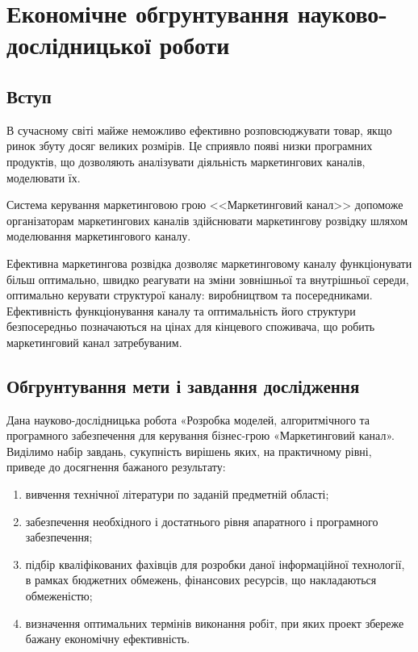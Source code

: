 ﻿\section{Економічне обгрунтування науково-дослідницької роботи}
    \subsection{Вступ}

В сучасному світі майже неможливо ефективно розповсюджувати товар, якщо ринок збуту досяг великих розмірів. Це сприявло появі низки програмних продуктів, що дозволяють аналізувати діяльність маркетингових каналів, моделювати їх.

Система керування маркетинговою грою <<Маркетинговий канал>> допоможе організаторам маркетингових каналів здійснювати маркетингову розвідку шляхом моделювання маркетингового каналу. 

Ефективна маркетингова розвідка дозволяє маркетинговому каналу функціонувати більш оптимально, швидко реагувати на зміни зовнішньої та внутрішньої середи, оптимально керувати структурої каналу: виробництвом та посередниками. Ефективність функціонування каналу та оптимальність його структури безпосередньо позначаються на цінах для кінцевого споживача, що робить маркетинговий канал затребуваним.

\subsection{Обгрунтування мети і завдання дослідження}
Дана науково-дослідницька робота «Розробка моделей, алгоритмічного та програмного забезпечення для керування бізнес-грою «Маркетинговий канал».
Виділимо набір завдань, сукупність вирішень яких, на практичному рівні, приведе до досягнення бажаного результату:

\begin{enumerate}
\item вивчення технічної літератури по заданій предметній області;
\item забезпечення необхідного і достатнього рівня апаратного і програмного забезпечення;
\item підбір кваліфікованих фахівців для розробки даної інформаційної технології, в рамках бюджетних обмежень, фінансових ресурсів, що накладаються обмеженістю;
\item визначення оптимальних термінів виконання робіт, при яких проект збереже бажану економічну ефективність.
\end{enumerate}

